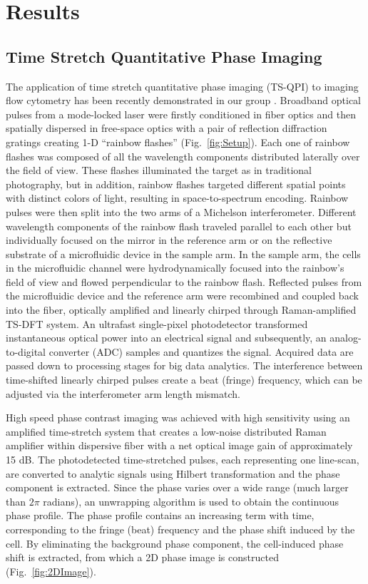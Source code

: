 \documentclass[aps,pra,reprint,longbibliography,superscriptaddress]{revtex4-1}
\begin{document}
\section{Results}
\subsection{Time Stretch Quantitative Phase Imaging}

The application of time stretch quantitative phase imaging (TS-QPI) to imaging flow cytometry has been recently demonstrated in our group \cite{mahjoubfar2013label}. Broadband optical pulses from a mode-locked laser were firstly conditioned in fiber optics and then spatially dispersed in free-space optics with a pair of reflection diffraction gratings creating 1-D ``rainbow flashes'' (Fig.~\ref{fig:Setup}). Each one of rainbow flashes was composed of all the wavelength components distributed laterally over the field of view. These flashes illuminated the target as in traditional photography, but in addition, rainbow flashes targeted different spatial points with distinct colors of light, resulting in space-to-spectrum encoding. Rainbow pulses were then split into the two arms of a Michelson interferometer. Different wavelength components of the rainbow flash traveled parallel to each other but individually focused on the mirror in the reference arm or on the reflective substrate of a microfluidic device in the sample arm. In the sample arm, the cells in the microfluidic channel were hydrodynamically focused \cite{knight1998hydrodynamic,lee2006hydrodynamic} into the rainbow's field of view and flowed perpendicular to the rainbow flash. Reflected pulses from the microfluidic device and the reference arm were recombined and coupled back into the fiber, optically amplified and linearly chirped through Raman-amplified TS-DFT system. An ultrafast single-pixel photodetector  transformed instantaneous optical power into an electrical signal and subsequently, an analog-to-digital converter (ADC) samples and quantizes the signal. Acquired data are passed down to processing stages for big data analytics. The interference between time-shifted linearly chirped pulses create a beat (fringe) frequency, which can be adjusted via the interferometer arm length mismatch.

High speed phase contrast imaging was achieved with high sensitivity using an amplified time-stretch system that creates a low-noise distributed Raman amplifier within dispersive fiber with a net optical image gain of approximately 15 dB. The photodetected time-stretched pulses, each representing one line-scan, are converted to analytic signals using Hilbert transformation \cite{king2009hilbert} and the phase component is extracted. Since the phase varies over a wide range (much larger than $2 \pi$ radians), an unwrapping algorithm is used to obtain the continuous phase profile. The phase profile contains an increasing term with time, corresponding to the fringe (beat) frequency and the phase shift induced by the cell. By eliminating the background phase component, the cell-induced phase shift is extracted, from which a 2D phase image is constructed (Fig.~\ref{fig:2DImage}).
\end{document}
